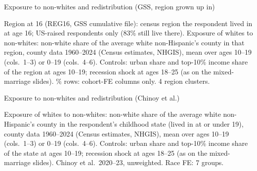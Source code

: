 \documentclass[aspectratio=169]{beamer}
\begin{document}
\begin{frame}{Exposure to non-whites and redistribution (GSS, region grown up in)}

\begin{table}
    \centering
    \scalebox{0.82}{\parbox{\linewidth}{\centering\tiny\setlength{\tabcolsep}{4pt}\renewcommand{\arraystretch}{0.72}
    }}
\end{table}
\vspace{-0.4em}
{\tiny Region at 16 (REG16, GSS cumulative file): census region the respondent lived in at age 16; US-raised respondents only (83\% still live there). Exposure of whites to non-whites: non-white share of the average white non-Hispanic's county in that region, county data 1960--2024 (Census estimates, NHGIS), mean over ages 10--19 (cols.\ 1--3) or 0--19 (cols.\ 4--6). Controls: urban share and top-10\% income share of the region at ages 10--19; recession shock at ages 18--25 (as on the mixed-marriage slides). \% rows: cohort-FE columns only. 4 region clusters.\par}

\end{frame}


\begin{frame}{Exposure to non-whites and redistribution (Chinoy et al.)}

\begin{table}
    \centering
    \scalebox{0.85}{\parbox{\linewidth}{\centering\tiny\setlength{\tabcolsep}{4pt}\renewcommand{\arraystretch}{0.72}
    }}
\end{table}
\vspace{-0.6em}
{\tiny Exposure of whites to non-whites: non-white share of the average white non-Hispanic's county in the respondent's childhood state (lived in at or under 19), county data 1960--2024 (Census estimates, NHGIS), mean over ages 10--19 (cols.\ 1--3) or 0--19 (cols.\ 4--6). Controls: urban share and top-10\% income share of the state at ages 10--19; recession shock at ages 18--25 (as on the mixed-marriage slides). Chinoy et al.\ 2020--23, unweighted. Race FE: 7 groups.\par}

\end{frame}
\end{document}
